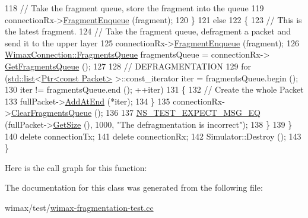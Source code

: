 \begin{DoxyCode}
118           \textcolor{comment}{// Take the fragment queue, store the fragment into the queue}
119           connectionRx->\hyperlink{classns3_1_1WimaxConnection_ae7d985915012a837359aa62413457045}{FragmentEnqueue} (fragment);
120         \}
121       \textcolor{keywordflow}{else}
122         \{
123           \textcolor{comment}{// This is the latest fragment.}
124           \textcolor{comment}{// Take the fragment queue, defragment a packet and send it to the upper layer}
125           connectionRx->\hyperlink{classns3_1_1WimaxConnection_ae7d985915012a837359aa62413457045}{FragmentEnqueue} (fragment);
126           \hyperlink{classns3_1_1WimaxConnection_acebd6aa95ab519f5e19bd1773f62e506}{WimaxConnection::FragmentsQueue} fragmentsQueue = connectionRx->
      \hyperlink{classns3_1_1WimaxConnection_adeb165ef2cb04d19edacf92d5c751cc6}{GetFragmentsQueue} ();
127 
128           \textcolor{comment}{// DEFRAGMENTATION}
129           \textcolor{keywordflow}{for} (\hyperlink{openflow-interface_8h_afd9bcfa176617760671b67580f536fa7}{std::list}<\hyperlink{classns3_1_1Ptr}{Ptr<const Packet>} >::const\_iterator iter = 
      fragmentsQueue.begin ();
130                iter != fragmentsQueue.end (); ++iter)
131             \{
132               \textcolor{comment}{// Create the whole Packet}
133               fullPacket->\hyperlink{classns3_1_1Packet_a14ec3d4250b425468764de58f5837b6b}{AddAtEnd} (*iter);
134             \}
135           connectionRx->\hyperlink{classns3_1_1WimaxConnection_a819008b698dd34be127c294c2ec1a198}{ClearFragmentsQueue} ();
136 
137           \hyperlink{group__testing_ga7304ba46a28d8cf08dfdfd6499cf7068}{NS\_TEST\_EXPECT\_MSG\_EQ} (fullPacket->\hyperlink{classns3_1_1Packet_a462855c9929954d4301a4edfe55f4f1c}{GetSize} (), 1000, \textcolor{stringliteral}{"The
       defragmentation is incorrect"});
138         \}
139     \}
140   \textcolor{keyword}{delete} connectionTx;
141   \textcolor{keyword}{delete} connectionRx;
142   Simulator::Destroy ();
143 \}
\end{DoxyCode}


Here is the call graph for this function\+:




The documentation for this class was generated from the following file\+:\begin{DoxyCompactItemize}
\item 
wimax/test/\hyperlink{wimax-fragmentation-test_8cc}{wimax-\/fragmentation-\/test.\+cc}\end{DoxyCompactItemize}
